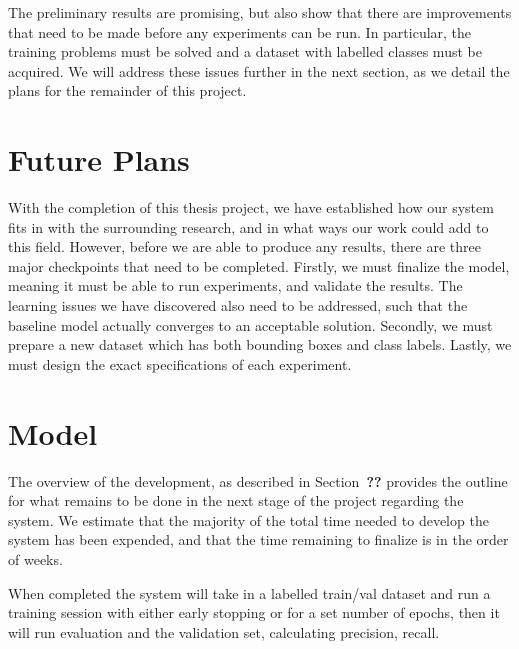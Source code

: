 The preliminary results are promising, but also show that there are improvements that need to be made before any experiments can be run.
In particular, the training problems must be solved and a dataset with labelled classes must be acquired.
We will address these issues further in the next section, as we detail the plans for the remainder of this project.

\section*{Future Plans}

With the completion of this thesis project, we have established how our system fits in with the surrounding research, and in what ways our work could add to this field.
However, before we are able to produce any results, there are three major checkpoints that need to be completed.
Firstly, we must finalize the model, meaning it must be able to run experiments, and validate the results.
The learning issues we have discovered also need to be addressed, such that the baseline model actually converges to an acceptable solution.
Secondly, we must prepare a new dataset which has both bounding boxes and class labels.
Lastly, we must design the exact specifications of each experiment.


\section*{Model}
The overview of the development, as described in Section~\textbf{??} provides the outline for what remains to be done in the next stage of the project regarding the system.
We estimate that the majority of the total time needed to develop the system has been expended, and that the time remaining to finalize is in the order of weeks.

When completed the system will take in a labelled train/val dataset and run a training session with either early stopping or for a set number of epochs, then it will run evaluation and the validation set, calculating precision, recall.

